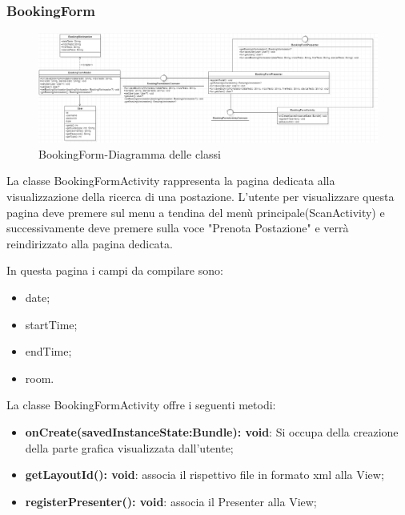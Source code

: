 \subsubsection{BookingForm}
\begin{figure}[H]
	\centering
	\includegraphics[width=16cm]{res/images/BookingForm.png}
	\caption{BookingForm-Diagramma delle classi}
	\label{fig:BookingForm-Diagramma delle classi}
\end{figure}
La classe BookingFormActivity rappresenta la pagina dedicata alla visualizzazione della ricerca di una postazione.
L'utente per visualizzare questa pagina deve premere sul menu a tendina del menù principale(ScanActivity) e successivamente deve premere sulla voce "Prenota Postazione" e verrà reindirizzato alla pagina dedicata.

In questa pagina i campi da compilare sono: 
\begin{itemize}
	\item date; 
	\item startTime; 
	\item endTime; 
	\item room.
	
\end{itemize}

La classe BookingFormActivity offre i seguenti metodi:
\begin{itemize}
	\item \textbf{onCreate(savedInstanceState:Bundle): void}: Si occupa della creazione della parte grafica visualizzata dall'utente; 
	\item \textbf{getLayoutId(): void}: associa il rispettivo file in formato xml alla View;
	\item \textbf{registerPresenter(): void}: associa il Presenter alla View; 
\end{itemize}


